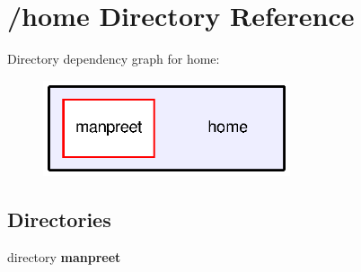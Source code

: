 \section{/home Directory Reference}
\label{dir_43e0a1f539e00dcfa1a6bc4d4fee4fc2}
Directory dependency graph for home\-:\nopagebreak
\begin{figure}[H]
\begin{center}
\leavevmode
\includegraphics[width=206pt]{dir_43e0a1f539e00dcfa1a6bc4d4fee4fc2_dep}
\end{center}
\end{figure}
\subsection*{Directories}
\begin{DoxyCompactItemize}
\item 
directory {\bf manpreet}
\end{DoxyCompactItemize}
